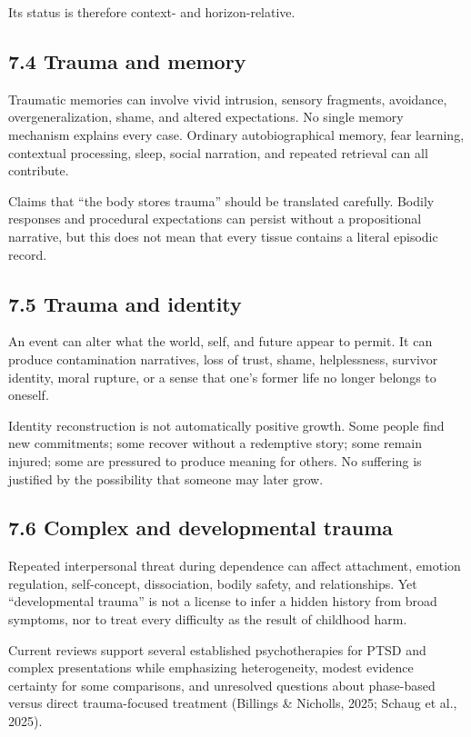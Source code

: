 \documentclass[
  11pt,
]{article}
\begin{document}
Its status is therefore context- and horizon-relative.

\subsection{7.4 Trauma and memory}\label{trauma-and-memory}

Traumatic memories can involve vivid intrusion, sensory fragments,
avoidance, overgeneralization, shame, and altered expectations. No
single memory mechanism explains every case. Ordinary autobiographical
memory, fear learning, contextual processing, sleep, social narration,
and repeated retrieval can all contribute.

Claims that ``the body stores trauma'' should be translated carefully.
Bodily responses and procedural expectations can persist without a
propositional narrative, but this does not mean that every tissue
contains a literal episodic record.

\subsection{7.5 Trauma and identity}\label{trauma-and-identity}

An event can alter what the world, self, and future appear to permit. It
can produce contamination narratives, loss of trust, shame,
helplessness, survivor identity, moral rupture, or a sense that one's
former life no longer belongs to oneself.

Identity reconstruction is not automatically positive growth. Some
people find new commitments; some recover without a redemptive story;
some remain injured; some are pressured to produce meaning for others.
No suffering is justified by the possibility that someone may later
grow.

\subsection{7.6 Complex and developmental
trauma}\label{complex-and-developmental-trauma}

Repeated interpersonal threat during dependence can affect attachment,
emotion regulation, self-concept, dissociation, bodily safety, and
relationships. Yet ``developmental trauma'' is not a license to infer a
hidden history from broad symptoms, nor to treat every difficulty as the
result of childhood harm.

Current reviews support several established psychotherapies for PTSD and
complex presentations while emphasizing heterogeneity, modest evidence
certainty for some comparisons, and unresolved questions about
phase-based versus direct trauma-focused treatment (Billings \&
Nicholls, 2025; Schaug et al., 2025).
\end{document}
